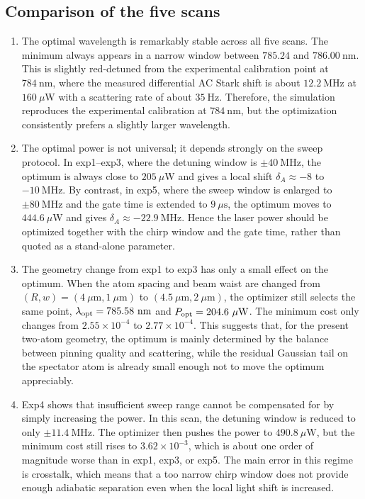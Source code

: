 \documentclass[aps,%
onecolumn,%
floatfix,%
pra,%
amsfonts,%
longbibliography,%
groupedaddress,%
superscriptaddress]{revtex4-2}%
\newcommand{\1}{\mathbbm{1}}
\begin{document}
\subsection{Comparison of the five scans}

\begin{enumerate}[label=(\roman*)]
    \item The optimal wavelength is remarkably stable across all five scans.
    The minimum always appears in a narrow window between $785.24$ and
    $786.00~\mathrm{nm}$. This is slightly red-detuned from the experimental
    calibration point at $784~\mathrm{nm}$, where the measured differential AC
    Stark shift is about $12.2~\mathrm{MHz}$ at
    $160~\mu\mathrm{W}$ with a scattering rate of about $35~\mathrm{Hz}$.
    Therefore, the simulation reproduces the experimental calibration at
    $784~\mathrm{nm}$, but the optimization consistently prefers a slightly
    larger wavelength.

    \item The optimal power is not universal; it depends strongly on the sweep
    protocol. In exp1--exp3, where the detuning window is
    $\pm 40~\mathrm{MHz}$, the optimum is always close to
    $205~\mu\mathrm{W}$ and gives a local shift
    $\delta_A \approx -8$ to $-10~\mathrm{MHz}$. By contrast, in exp5, where
    the sweep window is enlarged to $\pm 80~\mathrm{MHz}$ and the gate time is
    extended to $9~\mu\mathrm{s}$, the optimum moves to
    $444.6~\mu\mathrm{W}$ and gives
    $\delta_A \approx -22.9~\mathrm{MHz}$. Hence the laser power should be
    optimized together with the chirp window and the gate time, rather than
    quoted as a stand-alone parameter.

    \item The geometry change from exp1 to exp3 has only a small effect on the
    optimum. When the atom spacing and beam waist are changed from
    $(R,w)=(4~\mu\mathrm{m},1~\mu\mathrm{m})$ to
    $(4.5~\mu\mathrm{m},2~\mu\mathrm{m})$, the optimizer still selects the
    same point, $\lambda_{\rm opt}=785.58~\mathrm{nm}$ and
    $P_{\rm opt}=204.6~\mu\mathrm{W}$. The minimum cost only changes from
    $2.55\times 10^{-4}$ to $2.77\times 10^{-4}$. This suggests that, for the
    present two-atom geometry, the optimum is mainly determined by the balance
    between pinning quality and scattering, while the residual Gaussian tail on
    the spectator atom is already small enough not to move the optimum
    appreciably.

    \item Exp4 shows that insufficient sweep range cannot be compensated for by
    simply increasing the power. In this scan, the detuning window is reduced
    to only $\pm 11.4~\mathrm{MHz}$. The optimizer then pushes the power to
    $490.8~\mu\mathrm{W}$, but the minimum cost still rises to
    $3.62\times 10^{-3}$, which is about one order of magnitude worse than in
    exp1, exp3, or exp5. The main error in this regime is crosstalk, which
    means that a too narrow chirp window does not provide enough adiabatic
    separation even when the local light shift is increased.


\end{enumerate}
\end{document}
